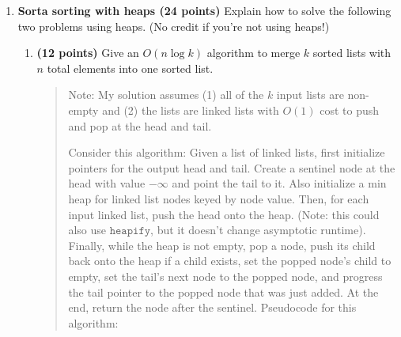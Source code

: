 \documentclass[11pt]{article}
\newcommand{\code}[1]{$\texttt{#1}$}
\begin{document}
\begin{enumerate}



\item {\bf Sorta sorting with heaps (24 points)} Explain how to solve the following two problems using heaps.
(No credit if you're not using heaps!)  
\begin{enumerate}
    \item {\bf (12 points)}
    Give an $O(n \log k)$
algorithm to merge $k$ sorted lists with $n$ total elements into one
sorted list.
\begin{quote}
  \color{purple}
  Note: My solution assumes (1) all of the $k$ input lists are non-empty and (2) the lists are linked lists with $O(1)$ cost to push and pop at the head and tail. 
  
  \medskip
  Consider this algorithm: Given a list of linked lists, first initialize pointers for the output head and tail. Create a sentinel node at the head with value $-\infty$ and point the tail to it. Also initialize a min heap for linked list nodes keyed by node value. Then, for each input linked list, push the head onto the heap. (Note: this could also use \code{heapify}, but it doesn't change asymptotic runtime). Finally, while the heap is not empty, pop a node, push its child back onto the heap if a child exists, set the popped node's child to empty, set the tail's next node to the popped node, and progress the tail pointer to the popped node that was just added. At the end, return the node after the sentinel. Pseudocode for this algorithm: 


\end{quote}
\end{enumerate}
\end{enumerate}
\end{document}

